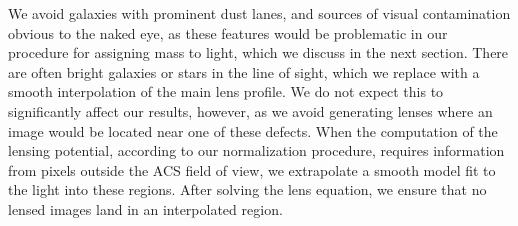 We avoid galaxies with prominent dust lanes, and sources of visual contamination obvious to the naked eye, as these features would be problematic in our procedure for assigning mass to light, which we discuss in the next section. There are often bright galaxies or stars in the line of sight, which we replace with a smooth interpolation of the main lens profile. We do not expect this to significantly affect our results, however, as we avoid generating lenses where an image would be located near one of these defects. When the computation of the lensing potential, according to our normalization procedure, requires information from pixels outside the ACS field of view, we extrapolate a smooth model fit to the light into these regions. After solving the lens equation, we ensure that no lensed images land in an interpolated region.

